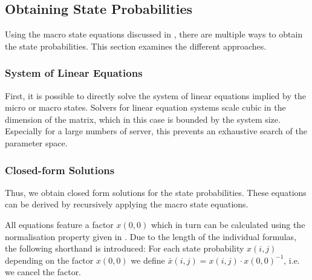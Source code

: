 \subsection{Obtaining State Probabilities}\label{sec:cloud:data_centers:closed_form_solution}
Using the macro state equations discussed in , there are multiple ways to obtain the state probabilities.
This section examines the different approaches.

\subsubsection*{System of Linear Equations}
First, it is possible to directly solve the system of linear equations implied by the micro or macro states.
Solvers for linear equation systems scale cubic in the dimension of the matrix, which in this case is bounded by the system size.
Especially for a large numbers of server, this prevents an exhaustive search of the parameter space.

\subsubsection*{Closed-form Solutions}
Thus, we obtain closed form solutions for the state probabilities.
These equations can be derived by recursively applying the macro state equations.

All equations feature a factor \(x(0, 0)\) which in turn can be calculated using the normalisation property given in .
Due to the length of the individual formulas, the following shorthand is introduced:
For each state probability \(x(i, j)\) depending on the factor \(x(0,0)\) we define \(\bar{x}(i, j) = x(i, j) \cdot x(0, 0)^{-1}\), i.e. we cancel the factor.

